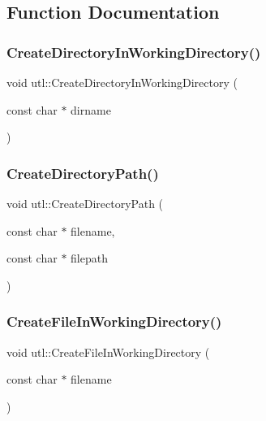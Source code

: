 \subsection{Function Documentation}
\mbox{\label{namespaceutl_a46d596900fabb65e6281dd634065dbf8}} 
\subsubsection{\texorpdfstring{Create\+Directory\+In\+Working\+Directory()}{CreateDirectoryInWorkingDirectory()}}
{\footnotesize\ttfamily void utl\+::\+Create\+Directory\+In\+Working\+Directory (\begin{DoxyParamCaption}\item[{const char $\ast$}]{dirname }\end{DoxyParamCaption})}

\mbox{\label{namespaceutl_a3815036b0f9a13c874992104948198f6}} 
\subsubsection{\texorpdfstring{Create\+Directory\+Path()}{CreateDirectoryPath()}}
{\footnotesize\ttfamily void utl\+::\+Create\+Directory\+Path (\begin{DoxyParamCaption}\item[{const char $\ast$}]{filename,  }\item[{const char $\ast$}]{filepath }\end{DoxyParamCaption})}

\mbox{\label{namespaceutl_adf4c2376b83a6713eaceb14c89b53f6a}} 
\subsubsection{\texorpdfstring{Create\+File\+In\+Working\+Directory()}{CreateFileInWorkingDirectory()}}
{\footnotesize\ttfamily void utl\+::\+Create\+File\+In\+Working\+Directory (\begin{DoxyParamCaption}\item[{const char $\ast$}]{filename }\end{DoxyParamCaption})}

